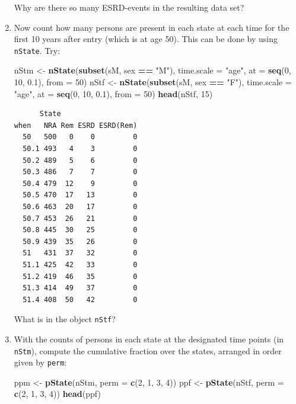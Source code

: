 \documentclass[
]{book}
\newenvironment{Shaded}{\begin{snugshade}}{\end{snugshade}}
\newcommand{\AttributeTok}[1]{\textcolor[rgb]{0.13,0.29,0.53}{#1}}
\newcommand{\DecValTok}[1]{\textcolor[rgb]{0.00,0.00,0.81}{#1}}
\newcommand{\FloatTok}[1]{\textcolor[rgb]{0.00,0.00,0.81}{#1}}
\newcommand{\FunctionTok}[1]{\textcolor[rgb]{0.13,0.29,0.53}{\textbf{#1}}}
\newcommand{\NormalTok}[1]{#1}
\newcommand{\OtherTok}[1]{\textcolor[rgb]{0.56,0.35,0.01}{#1}}
\newcommand{\SpecialCharTok}[1]{\textcolor[rgb]{0.81,0.36,0.00}{\textbf{#1}}}
\newcommand{\StringTok}[1]{\textcolor[rgb]{0.31,0.60,0.02}{#1}}
\begin{document}
\begin{enumerate}
  Why are there so many ESRD-events in the resulting data set?
\item
  Now count how many persons are present in each state
  at each time for the first 10 years after entry (which is at age 50). This
  can be done by using \texttt{nState}. Try:

\begin{Shaded}
\begin{Highlighting}[]
\NormalTok{nStm }\OtherTok{\textless{}{-}} \FunctionTok{nState}\NormalTok{(}\FunctionTok{subset}\NormalTok{(sM, sex }\SpecialCharTok{==} \StringTok{"M"}\NormalTok{), }\AttributeTok{time.scale =} \StringTok{"age"}\NormalTok{, }
               \AttributeTok{at =} \FunctionTok{seq}\NormalTok{(}\DecValTok{0}\NormalTok{, }\DecValTok{10}\NormalTok{, }\FloatTok{0.1}\NormalTok{), }
             \AttributeTok{from =} \DecValTok{50}\NormalTok{)}
\NormalTok{nStf }\OtherTok{\textless{}{-}} \FunctionTok{nState}\NormalTok{(}\FunctionTok{subset}\NormalTok{(sM, sex }\SpecialCharTok{==} \StringTok{"F"}\NormalTok{), }\AttributeTok{time.scale =} \StringTok{"age"}\NormalTok{, }
               \AttributeTok{at =} \FunctionTok{seq}\NormalTok{(}\DecValTok{0}\NormalTok{, }\DecValTok{10}\NormalTok{, }\FloatTok{0.1}\NormalTok{), }
             \AttributeTok{from =} \DecValTok{50}\NormalTok{)}
\FunctionTok{head}\NormalTok{(nStf, }\DecValTok{15}\NormalTok{)}
\end{Highlighting}
\end{Shaded}

\begin{verbatim}
      State
when   NRA Rem ESRD ESRD(Rem)
  50   500   0    0         0
  50.1 493   4    3         0
  50.2 489   5    6         0
  50.3 486   7    7         0
  50.4 479  12    9         0
  50.5 470  17   13         0
  50.6 463  20   17         0
  50.7 453  26   21         0
  50.8 445  30   25         0
  50.9 439  35   26         0
  51   431  37   32         0
  51.1 425  42   33         0
  51.2 419  46   35         0
  51.3 414  49   37         0
  51.4 408  50   42         0
\end{verbatim}

  What is in the object \texttt{nStf}?
\item
  With the counts of persons in each state at the
  designated time points (in \texttt{nStm}), compute the cumulative
  fraction over the states, arranged in order given by \texttt{perm}:

\begin{Shaded}
\begin{Highlighting}[]
\NormalTok{ppm }\OtherTok{\textless{}{-}} \FunctionTok{pState}\NormalTok{(nStm, }\AttributeTok{perm =} \FunctionTok{c}\NormalTok{(}\DecValTok{2}\NormalTok{, }\DecValTok{1}\NormalTok{, }\DecValTok{3}\NormalTok{, }\DecValTok{4}\NormalTok{))}
\NormalTok{ppf }\OtherTok{\textless{}{-}} \FunctionTok{pState}\NormalTok{(nStf, }\AttributeTok{perm =} \FunctionTok{c}\NormalTok{(}\DecValTok{2}\NormalTok{, }\DecValTok{1}\NormalTok{, }\DecValTok{3}\NormalTok{, }\DecValTok{4}\NormalTok{))}
\FunctionTok{head}\NormalTok{(ppf)}
\end{Highlighting}
\end{Shaded}


\end{enumerate}
\end{document}
